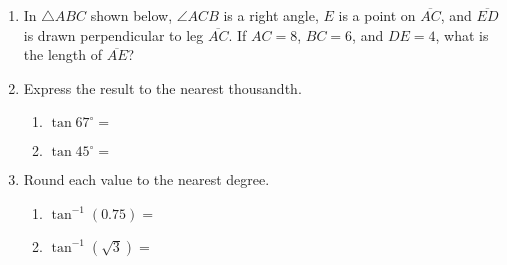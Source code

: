 \documentclass[12pt, twoside]{article}
\begin{document}
\begin{enumerate}
\item In $\triangle ABC$ shown below, $\angle ACB$ is a right angle, $E$ is a point on $\overline{AC}$, and $\overline{ED}$ is drawn perpendicular to leg $\overline{AC}$. If $AC = 8$, $BC = 6$, and $DE = 4$, what is the length of $\overline{AE}$? 
\begin{flushright}
\end{flushright} 

\newpage
\item Express the result to the nearest thousandth.  \vspace{.5cm}
    \begin{multicols}{2}
      \begin{enumerate}
        \item $\tan 67^\circ = $ \vspace{1cm}
        \item $\tan 45^\circ =$
      \end{enumerate}
    \end{multicols} \vspace{1cm}

    \item Round each value to the nearest degree.  \vspace{.5cm}
    \begin{multicols}{2}
      \begin{enumerate}
        \item $\tan^{-1} (0.75) = $ \vspace{1cm}
        \item $\tan^{-1} (\sqrt{3}) =$
      \end{enumerate}
    \end{multicols} \vspace{1cm}


\end{enumerate}
\end{document}
